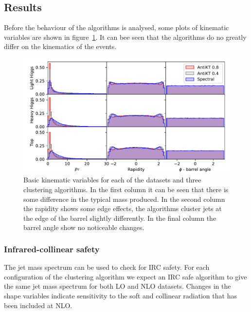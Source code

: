 \subsection{Results}

Before the behaviour of the algorithms is analysed, some plots of kinematic variables are shown
in figure~\ref{fig:kinematics}.
It can bee seen that the algorithms do no greatly differ on the kinematics of the events.

\begin{figure}[htp]
    \begin{minipage}[c]{0.7\textwidth}
    \begin{center}
    \includegraphics[width=\textwidth]{graphics/kinematics}
\end{center}
\end{minipage}
    \begin{minipage}[c]{0.25\textwidth}
        \caption{Basic kinematic variables for each of the datasets and three clustering algorithms.
            In the first column it can be seen that there is some difference in the typical mass produced.
            In the second column the rapidity shows some edge effects,
            the algorithms cluster jets at the edge of the barrel slightly differently.
            In the final column the barrel angle show no noticeable changes.
        }\label{fig:kinematics}
\end{minipage}
\end{figure}

\subsubsection{Infrared-collinear safety}
The jet mass spectrum can be used to check for IRC safety.
For each configuration of the clustering algorithm we expect an IRC safe algorithm to give the 
same jet mass spectrum for both LO and NLO datasets.
Changes in the shape variables indicate sensitivity to the soft and collinear radiation that
has been included at NLO.



